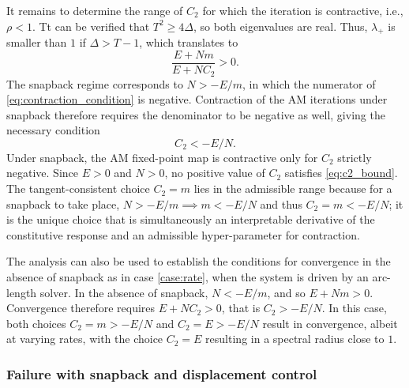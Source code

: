 \documentclass[10pt,review]{cas-sc}
\begin{document}
It remains to determine the range of $C_2$ for which the iteration is contractive, i.e., $\rho < 1$. Tt can be verified that $T^2 \geq 4\Delta$, so both eigenvalues are real. Thus, $\lambda_+$ is smaller than $1$ if $\Delta > T-1$, which translates to 
\begin{equation}
	\frac{E+Nm}{E+NC_2} >0. \label{eq:contraction_condition}
\end{equation}
The snapback regime corresponds to $N>-E/m$, in which the numerator of \eqref{eq:contraction_condition} is negative. Contraction of the AM iterations under snapback therefore requires the denominator to be negative as well, giving the necessary condition
\begin{equation}
	C_2<-E/N. \label{eq:c2_bound}
\end{equation}
Under snapback, the AM fixed-point map is contractive only for $C_2$ strictly negative. Since $E>0$ and $N>0$, no positive value of $C_2$ satisfies \eqref{eq:c2_bound}. The tangent-consistent choice $C_2=m$ lies in the admissible range because for a snapback to take place, $N>-E/m \implies m<-E/N$ and thus $C_2=m<-E/N$; it is the unique choice that is simultaneously an interpretable derivative of the constitutive response and an admissible hyper-parameter for contraction. 

The analysis can also be used to establish the conditions for convergence in the absence of snapback as in case \ref{case:rate}, when the system is driven by an arc-length solver. In the absence of snapback, $N< -E/m$, and so $E+Nm>0$. Convergence therefore requires $E+NC_2>0$, that is $C_2 > -E/N$. In this case, both choices $C_2=m >-E/N$ and $C_2=E >-E/N$ result in convergence, albeit at varying rates, with the choice $C_2=E$ resulting in a spectral radius close to $1$.


\subsubsection*{Failure with snapback and displacement control}
\end{document}
